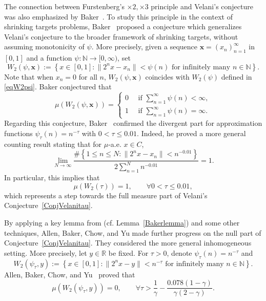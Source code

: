 \documentclass[10pt,a4paper]{amsart}
\numberwithin{equation}{section} %
\newcommand{\R}{\mathbb{R}}
\newcommand{\N}{\mathbb{N}}
\begin{document}
The connection between Furstenberg's $\times 2, \times 3$ principle and Velani's conjecture  was also emphasized by Baker~\cite{Baker25A}.
To  study  this principle in the context of shrinking targets problems, 
Baker~\cite{Baker25A} proposed a  conjecture which generalizes Velani's conjecture to the  broader framework of shrinking targets, without assuming monotonicity of $\psi$. More precisely,
given a sequence  $\mathbf{x}=(x_n)_{n=1}^{\infty}$ in $[0,1]$ and a function $\psi:\N\to[0,\infty)$, set
\[W_2(\psi,\mathbf{x}):=\left\{x\in[0,1]: \|2^nx-x_n\|<\psi(n)\text{ for infinitely many }n\in \N\right\}.\]
Note that when $x_n=0$ for all $n$, $W_2(\psi,\mathbf{x})$ coincides with $W_2(\psi)$ defined in \eqref{eqW2psi}.
Baker conjectured that 
\begin{equation}\label{BakerConj}
\mu(W_2(\psi,\mathbf{x}))=\begin{cases}
	0 \quad  \text{ if }\sum_{n=1}^{\infty}\psi(n)<\infty,\\
	1 \quad \text{ if }\sum_{n=1}^{\infty}\psi(n)=\infty.
\end{cases}
\end{equation}
Regarding this conjecture, Baker~\cite{Baker25A} confirmed the divergent part for approximation functions $\psi_{\tau}(n)=n^{-\tau}$ with $0<\tau\leq 0.01$. Indeed, he proved a more general counting result stating that for $\mu$-a.e. $x\in C$, 
\begin{equation}\label{BakerMainthm}
\lim_{N\to\infty}\frac{\#\left\{1\leq n\leq  N:\|2^nx-x_n\|<n^{-0.01}\right\}}{2\sum_{n=1}^{N}n^{-0.01}}=1.
\end{equation}
In particular, this implies that
\begin{equation}\label{eqBaker001}
\mu(W_2(\tau))=1, \qquad \forall 0<\tau\leq 0.01,
\end{equation}
which represents a step towards the full measure part of Velani's Conjecture~\ref{ConjVelanitau}.

By applying a key lemma from \cite{Baker25A} (cf. Lemma~\ref{Bakerlemma})  and some other techniques,  
Allen, Baker, Chow, and Yu \cite{ABCY23A} made further progress on the null part of Conjecture~\ref{ConjVelanitau}. They considered the more general inhomogeneous setting. More precisely, let $y\in \R$ be fixed. 
For $\tau>0$, denote $\psi_{\tau}(n)=n^{-\tau}$ and
\begin{equation}\label{eqW2tauy}
 W_{2}(\psi_{\tau},y):=\left\{x\in[0,1]: \|2^{n}x-y\|<n^{-\tau}\text{ for infinitely many } n\in\mathbb{N}\right\}. 
\end{equation}
Allen, Baker, Chow, and Yu~\cite{ABCY23A} proved that 
\begin{equation}\label{ThmABCYCon}
\mu(W_2(\psi_{\tau}, y)) = 0, \qquad  \forall \tau>\frac{1}{\gamma}-\frac{0.078(1-\gamma)}{\gamma(2-\gamma)}.
\end{equation}
\end{document}
